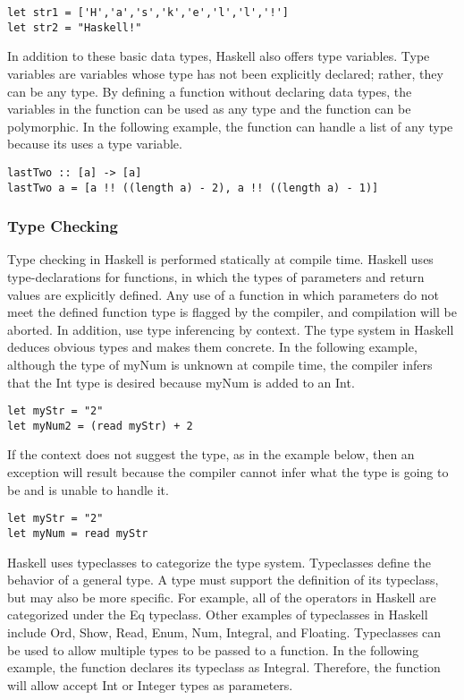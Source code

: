 \documentclass[titlepage,12pt]{article}
\begin{document}
\begin{verbatim}
let str1 = ['H','a','s','k','e','l','l','!']
let str2 = "Haskell!"
\end{verbatim}

In addition to these basic data types, Haskell also offers type variables. Type variables are variables whose type has 
not been explicitly declared; rather, they can be any type. By defining a function without declaring data types, the 
variables in the function can be used as any type and the function can be polymorphic. In the following example, the 
function can handle a list of any type because its uses a type variable. 

\begin{verbatim}
lastTwo :: [a] -> [a]
lastTwo a = [a !! ((length a) - 2), a !! ((length a) - 1)]
\end{verbatim}

\subsubsection{Type Checking}
Type checking in Haskell is performed statically at compile time. Haskell uses type-declarations for functions, in 
which the types of parameters and return values are explicitly defined. Any use of a function in which parameters 
do not meet the defined function type is flagged by the compiler, and compilation will be aborted. In addition, 
use type inferencing by context. The type system in Haskell deduces obvious types and makes them concrete. In the 
following example, although the type of myNum is unknown at compile time, the compiler infers that the Int type 
is desired because myNum is added to an Int. 

\begin{verbatim}
let myStr = "2" 
let myNum2 = (read myStr) + 2
\end{verbatim}

If the context does not suggest the type, as in the example below, then an exception will result because the 
compiler cannot infer what the type is going to be and is unable to handle it. 

\begin{verbatim}
let myStr = "2" 
let myNum = read myStr
\end{verbatim}

Haskell uses typeclasses to categorize the type system. Typeclasses define the behavior of a general type. 
A type must support the definition of its typeclass, but may also be more specific. For example, all of the 
operators in Haskell are categorized under the Eq typeclass. Other examples of typeclasses in Haskell include Ord, 
Show, Read, Enum, Num, Integral, and Floating. Typeclasses can be used to allow multiple types to be passed to a 
function. In the following example, the function declares its typeclass as Integral. Therefore, the function will 
allow accept Int or Integer types as parameters. 
\end{document}
